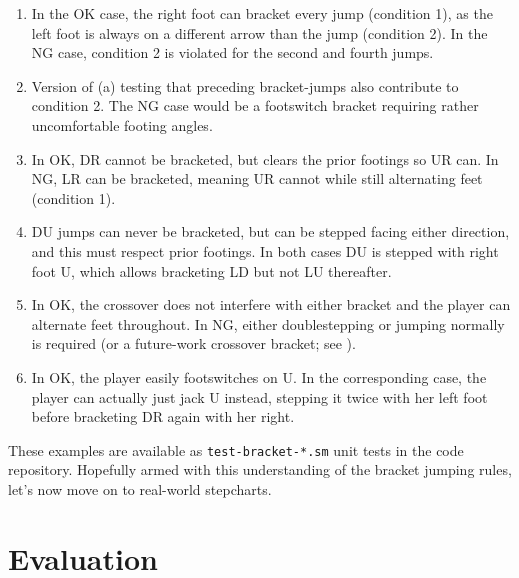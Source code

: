 \documentclass[10pt]{sigplanconf}
\begin{document}
\renewcommand{\theenumi}{\alph{enumi}}
\begin{enumerate}
	\item In the OK case, the right foot can bracket every jump (condition 1),
		as the left foot is always on a different arrow than the jump (condition 2).
		In the NG case, condition 2 is violated for the second and fourth jumps.
	\item Version of (a) testing that preceding bracket-jumps also contribute to condition 2.
		The NG case would be a footswitch bracket requiring rather uncomfortable footing angles.
	\item In OK, DR cannot be bracketed, but clears the prior footings so UR can.
		In NG, LR can be bracketed, meaning UR cannot while still alternating feet (condition 1).
	\item DU jumps can never be bracketed, but can be stepped facing either direction, and this must respect prior footings.
		In both cases DU is stepped with right foot U, which allows bracketing LD but not LU thereafter.
	\item In OK, the crossover does not interfere with either bracket and the player can alternate feet throughout.
		In NG, either doublestepping or jumping normally is required
		(or a future-work crossover bracket; see ).
	\item In OK, the player easily footswitches on U.
		In the corresponding case, the player can actually just jack U instead, stepping it twice with her left foot
		before bracketing DR again with her right.
\end{enumerate}
\renewcommand{\theenumi}{\arabic{enumi}}

These examples are available as {\tt test-bracket-*.sm} unit tests in the code repository.
Hopefully armed with this understanding of the bracket jumping rules, let's now move on to real-world stepcharts.




\section{Evaluation}
\end{document}
